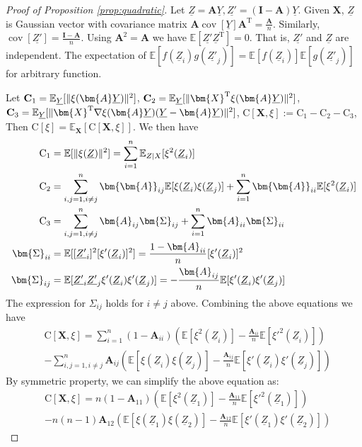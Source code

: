 \documentclass[conference]{IEEEtran}
\DeclarePairedDelimiter\norm{\lVert}{\rVert}
\def\E{\mathbb{E}}
\def\T{\mathrm{T}}
\DeclareMathOperator*{\Cov}{cov}
\begin{document}
\begin{proof}[Proof of Proposition \ref{prop:quadratic}]
Let $\underline{Z} = \bm{A}\underline{Y}, \underline{Z'} = (\mathbf{I} - \bm{A})\underline{Y}$. Given $\bm{X}$, $\underline{Z}$ is Gaussian vector with covariance matrix $\bm{A} \Cov[\underline{Y}] \bm{A}^\T = \frac{\bm{A}}{n}$. Similarly, $\Cov[\underline{Z'}] = \frac{\mathbf{I} - \bm{A}}{n}$. Using $\bm{A}^2 = \bm{A}$ we have $\E[\underline{Z'}\underline{Z}^\T] = 0$. That is, $\underline{Z'}$ and $\underline{Z}$ are independent. The expectation of $\E[f(\underline{Z}_i)g(\underline{Z'}_j)] = \E[f(\underline{Z}_i)]\E[g(\underline{Z'}_j)]$ for arbitrary function.
    
Let $\mathbf{C}_1 = \E_{\underline{Y}} [\norm{\xi(\bm{A}\underline{Y})}^2]$, $\mathbf{C}_2 
= \E_{\underline{Y}}
[\norm{\bm{X}^\T\xi(\bm{A}\underline{Y})}^2]$, $\mathbf{C}_3 
= \E_{\underline{Y}}
[\norm{\bm{X}^\T \nabla\xi(\bm{A}\underline{Y})(\underline{Y}-\bm{A}\underline{Y})}^2]$,
$\mathrm{C}[\bm{X}, \xi] :=  \mathrm{C}_1 - \mathrm{C}_2 - \mathrm{C}_3$, Then $\mathrm{C}[\xi] = \E_{\bm{X}}[\mathrm{C}[\bm{X}, \xi]]$.
We then have
\begin{align*}
    \mathrm{C}_1 &=\E[\norm{\xi(\underline{Z})}^2] = \sum_{i=1}^n \E_{Z|X}[\xi^2(\underline{Z}_i)] \\
    \mathrm{C}_2 &= \sum_{i,j=1, i \neq j}^n \bm{\bm{A}}_{ij}\E[\xi(\underline{Z}_i)\xi(\underline{Z}_j)] +
    \sum_{i=1}^n \bm{\bm{A}}_{ii}  \E[\xi^2(\underline{Z}_i)] \\
    \mathrm{C}_3 & = \sum_{i,j=1, i \neq j}^n \bm{A}_{ij}\bm{\Sigma}_{ij} +
    \sum_{i=1}^n \bm{A}_{ii}\bm{\Sigma}_{ii}    \\
    \bm{\Sigma}_{ii} &=  \E[ [\underline{Z'}_i]^2 [\xi'(\underline{Z}_i)]^2] = \frac{1-\bm{A}_{ii}}{n}[\xi'(\underline{Z}_i)]^2   \\
    \bm{\Sigma}_{ij} &=  \E[\underline{Z'}_i \underline{Z'}_j \xi'(\underline{Z}_i)
    \xi'(\underline{Z}_j)]
     = - \frac{\bm{A}_{ij}}{n} \E[ \xi'(\underline{Z}_i)
    \xi'(\underline{Z}_j)]
\end{align*}
The expression for $\Sigma_{ij}$ holds for $i \neq j$ above. Combining the above equations we have
\begin{align*}
   &  \mathrm{C}[\bm{X}, \xi] = \sum_{i=1}^n (1-\bm{A}_{ii})(\E[\xi^2(\underline{Z}_i)] -
    \frac{ \bm{A}_{ii}}{n} \E[ \xi'^2(\underline{Z}_i)]) \\
    &- \sum_{i,j=1, i \neq j}^n \bm{A}_{ij} (\E[\xi(\underline{Z}_i)\xi(\underline{Z}_j)] -
    \frac{\bm{A}_{ij}}{n}\E[\xi'(\underline{Z}_i) \xi'(\underline{Z}_j)])
\end{align*}
By symmetric property, we can simplify the above equation as:
\begin{align*}
    &  \mathrm{C}[\bm{X}, \xi] =n(1-\bm{A}_{11})(\E[\xi^2(\underline{Z}_1)] -
    \frac{\bm{A}_{11}}{n}  \E[ \xi'^2(\underline{Z}_1)]) \\
    &- n(n-1)\bm{A}_{12}(\E[\xi(\underline{Z}_1)\xi(\underline{Z}_2)] -
    \frac{\bm{A}_{12}}{n}\E[\xi'(\underline{Z}_1)
   \xi'(\underline{Z}_2)])\nonumber
\end{align*}


\end{proof}
\end{document}
